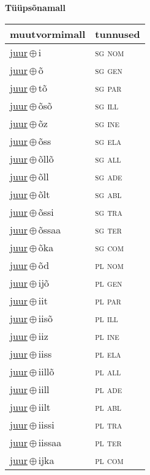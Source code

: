 

\vspace{3.5em}
\noindent \begin{minipage}{\textwidth}
\noindent \textbf{Tüüpsõnamall \,}\\

\begin{sideways}
\begin{tabular}{l l}
muutvormimall & tunnused \\
\hline
\underline{juur}\,$\oplus$\,i & \textsc{ sg nom } \\
\underline{juur}\,$\oplus$\,õ & \textsc{ sg gen } \\
\underline{juur}\,$\oplus$\,tõ & \textsc{ sg par } \\
\underline{juur}\,$\oplus$\,õsõ & \textsc{ sg ill } \\
\underline{juur}\,$\oplus$\,õz & \textsc{ sg ine } \\
\underline{juur}\,$\oplus$\,õss & \textsc{ sg ela } \\
\underline{juur}\,$\oplus$\,õllõ & \textsc{ sg all } \\
\underline{juur}\,$\oplus$\,õll & \textsc{ sg ade } \\
\underline{juur}\,$\oplus$\,õlt & \textsc{ sg abl } \\
\underline{juur}\,$\oplus$\,õssi & \textsc{ sg tra } \\
\underline{juur}\,$\oplus$\,õssaa & \textsc{ sg ter } \\
\underline{juur}\,$\oplus$\,õka & \textsc{ sg com } \\
\underline{juur}\,$\oplus$\,õd & \textsc{ pl nom } \\
\underline{juur}\,$\oplus$\,ijõ & \textsc{ pl gen } \\
\underline{juur}\,$\oplus$\,iit & \textsc{ pl par } \\
\underline{juur}\,$\oplus$\,iisõ & \textsc{ pl ill } \\
\underline{juur}\,$\oplus$\,iiz & \textsc{ pl ine } \\
\underline{juur}\,$\oplus$\,iiss & \textsc{ pl ela } \\
\underline{juur}\,$\oplus$\,iillõ & \textsc{ pl all } \\
\underline{juur}\,$\oplus$\,iill & \textsc{ pl ade } \\
\underline{juur}\,$\oplus$\,iilt & \textsc{ pl abl } \\
\underline{juur}\,$\oplus$\,iissi & \textsc{ pl tra } \\
\underline{juur}\,$\oplus$\,iissaa & \textsc{ pl ter } \\
\underline{juur}\,$\oplus$\,ijka & \textsc{ pl com } \\
\end{tabular}
\end{sideways}
\label{tab:tüüpsõnamall-juuri}

\end{minipage}

